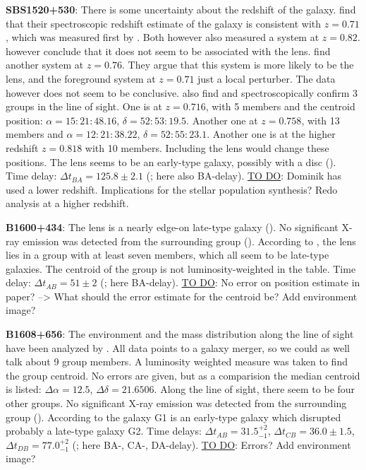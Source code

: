 \documentclass[10pt]{article}
\begin{document}
\textbf{SBS1520+530}: There is some uncertainty about the redshift of the galaxy. \cite{2002A&A...391..481B} find that their spectroscopic redshift estimate of the galaxy is consistent with $z=0.71$, which was measured first by \cite{1997A&A...318L..67C}. Both however also measured a system at $z=0.82$. \cite{2002A&A...391..481B} however conclude that it does not seem to be associated with the lens. \cite{2008ApJ...673..778A} find another system at $z=0.76$. They argue that this system is more likely to be the lens, and the foreground system at $z=0.71$ just a local perturber. The data however does not seem to be conclusive. \cite{2008ApJ...673..778A} also find and spectroscopically confirm 3 groups in the line of sight. One is at $z=0.716$, with 5 members and the centroid position: $\alpha=15:21:48.16$, $\delta=52:53:19.5$. Another one at $z=0.758$, with 13 members and $\alpha=12:21:38.22$, $\delta=52:55:23.1$. Another one is at the higher redshift $z=0.818$ with 10 members. Including the lens would change these positions. The lens seems to be an early-type galaxy, possibly with a disc (\cite{2008ApJ...673..778A}). Time delay: $\Delta t_{BA}=125.8\pm2.1$ (\cite{2011A&A...536A..44E}; here also BA-delay). \underline{TO DO}: Dominik has used a lower redshift. Implications for the stellar population synthesis? Redo analysis at a higher redshift.

\textbf{B1600+434}: The lens is a nearly edge-on late-type galaxy (\cite{1997A&A...317L..39J}). No significant X-ray emission was detected from the surrounding group (\cite{2005ApJ...625..633D}). According to \cite{2007AJ....134..668A}, the lens lies in a group with at least seven members, which all seem to be late-type galaxies. The centroid of the group is not luminosity-weighted in the table. Time delay: $\Delta t_{AB}=51\pm2$ (\cite{2000ApJ...544..117B}; here BA-delay). \underline{TO DO}: No error on position estimate in paper? --> What should the error estimate for the centroid be? Add environment image?

\textbf{B1608+656}: The environment and the mass distribution along the line of sight have been analyzed by \cite{2006ApJ...642...30F}. All data points to a galaxy merger, so we could as well talk about 9 group members. A luminosity weighted measure was taken to find the group centroid. No errors are given, but as a comparision the median centroid is listed: $\Delta\alpha = 12.5$, $\Delta\delta = 21.6506$. Along the line of sight, there seem to be four other groups. No significant X-ray emission was detected from the surrounding group (\cite{2005ApJ...625..633D}). According to \cite{2003ApJ...584..100S} the galaxy G1 is an early-type galaxy which disrupted probably a late-type galaxy G2. Time delays: $\Delta t_{AB}=31.5^{+2}_{-1}$, $\Delta t_{CB}=36.0\pm1.5$, $\Delta t_{DB}=77.0^{+2}_{-1}$ (\cite{2002ApJ...581..823F}; here BA-, CA-, DA-delay). \underline{TO DO}: Errors? Add environment image?
\end{document}
